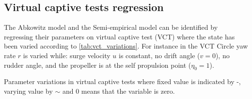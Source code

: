 \subsection{Virtual captive tests regression}
\label{sec:VCT_regression}
The Abkowitz model and the Semi-empirical model can be identified by regressing their parameters on virtual captive test (VCT) where the state has been varied according to \autoref{tab:vct_variations}. For instance in the VCT Circle yaw rate $r$ is varied while: surge velocity $u$ is constant, no drift angle ($v=0$), no rudder angle, and the propeller is at the self propulsion point ($\eta_0=1$).  
\begin{table}[h!]
    \centering
    \caption{Parameter variations in virtual captive tests where fixed value is indicated by -, varying value by $\sim$ and 0 means that the variable is zero.}
    \label{tab:vct_variations}
\end{table}